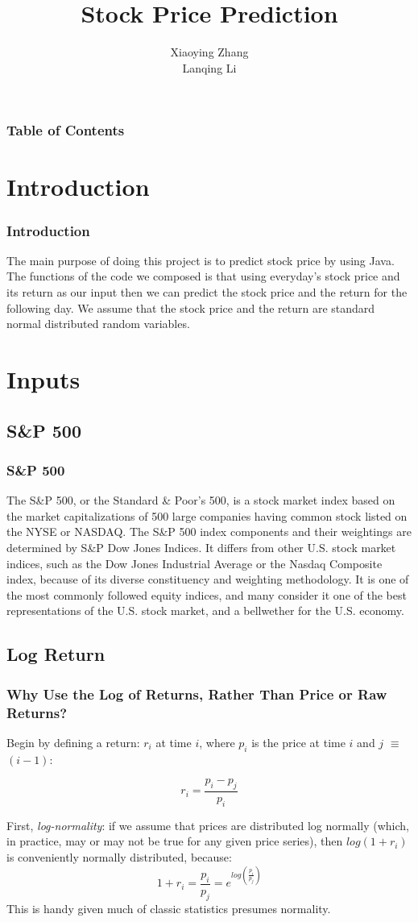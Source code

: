 \documentclass[mathserif]{beamer}
\title{Stock Price Prediction}
\author{Xiaoying Zhang \\ Lanqing Li}\institute{University of Washington}
\begin{document}
\begin{frame}
\titlepage

\end{frame}

\begin{frame}
\frametitle{Table of Contents}
\tableofcontents
\end{frame}

\section{Introduction}
\begin{frame}
\frametitle{Introduction}
The main purpose of doing this project is to predict stock price by using Java. The functions of the code we composed is that using everyday's stock price and its return as our input then we can predict the stock price and the return for the following day. We assume that the stock price and the return are standard normal distributed random variables.
\end{frame}

\section{Inputs}
\subsection{S\&P 500}
\begin{frame}
\frametitle{S\&P 500}
The S\&P 500, or the Standard \& Poor's 500, is a stock market index based on the market capitalizations of 500 large companies having common stock listed on the NYSE or NASDAQ. The S\&P 500 index components and their weightings are determined by S\&P Dow Jones Indices. It differs from other U.S. stock market indices, such as the Dow Jones Industrial Average or the Nasdaq Composite index, because of its diverse constituency and weighting methodology. It is one of the most commonly followed equity indices, and many consider it one of the best representations of the U.S. stock market, and a bellwether for the U.S. economy.
\end{frame}

\subsection{Log Return}
\begin{frame}
\frametitle{Why Use the Log of Returns, Rather Than Price or Raw Returns?}
Begin by defining a return: $r_i$ at time $i$, where $p_i$ is the price at time $i$ and $j$ $\equiv$ $(i - 1)$:

\[r_i = \frac{p_i - p_j}{p_i}\]

First, {\em log-normality}: if we assume that prices are distributed log normally (which, in practice, may or may not be true for any given price series), then $log(1 + r_i)$ is conveniently normally distributed, because:
\[1 + r_i = \frac{p_i}{p_j} = e^{log(\frac{p_i}{p_j})}\]
This is handy given much of classic statistics presumes normality.
\end{frame}
\end{document}
